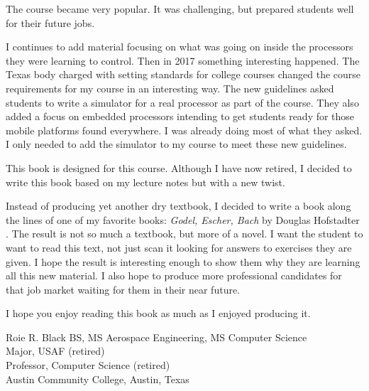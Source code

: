 The course became very popular. It was challenging, but prepared students well
for their future jobs.

I continues to add material focusing on what was going on inside the processors
they were learning to control. Then in 2017 something interesting happened. The
Texas body charged with setting standards for college courses changed the
course requirements for my course in an interesting way. The new guidelines
asked students to write a simulator for a real processor as part of the course.
They also added a focus on embedded processors intending to get students ready
for those mobile platforms found everywhere. I was already doing most of what
they asked. I only needed to add the simulator to my course to meet these new
guidelines.

This book is designed for this course. Although I have now retired, I decided
to write this book based on my lecture notes but with a new twist.

Instead of producing yet another dry textbook, I decided to write a book along
the lines of one of my favorite books: \emph{Godel, Escher, Bach} by Douglas
Hofstadter \cite{Hofstadter:1999}. The result is not so much a textbook, but more
of a novel. I want the student to want to read this text, not just scan it
looking for answers to exercises they are given. I hope the result is
interesting enough to show them why they are learning all this new material. I
also hope to produce more professional candidates for that job market waiting
for them in their near future.

I hope you enjoy reading this book as much as I enjoyed producing it.

Roie R. Black  BS, MS Aerospace Engineering, MS Computer Science\\
Major, USAF (retired) \\
Professor, Computer Science (retired) \\
Austin Community College, Austin, Texas
